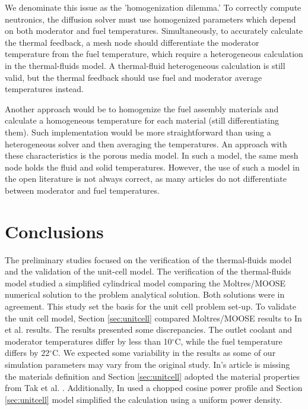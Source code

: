 We denominate this issue as the 'homogenization dilemma.'
To correctly compute neutronics, the diffusion solver must use homogenized parameters which depend on both moderator and fuel temperatures.
Simultaneously, to accurately calculate the thermal feedback, a mesh node should differentiate the moderator temperature from the fuel temperature, which require a heterogeneous calculation in the thermal-fluids model.
A thermal-fluid heterogeneous calculation is still valid, but the thermal feedback should use fuel and moderator average temperatures instead.

Another approach would be to homogenize the fuel assembly materials and calculate a homogeneous temperature for each material (still differentiating them).
Such implementation would be more straightforward than using a heterogeneous solver and then averaging the temperatures.
An approach with these characteristics is the porous media model.
In such a model, the same mesh node holds the fluid and solid temperatures.
However, the use of such a model in the open literature is not always correct, as many articles do not differentiate between moderator and fuel temperatures.

\section{Conclusions}

The preliminary studies focused on the verification of the thermal-fluids model and the validation of the unit-cell model.
The verification of the thermal-fluids model studied a simplified cylindrical model comparing the Moltres/MOOSE numerical solution to the problem analytical solution.
Both solutions were in agreement.
This study set the basis for the unit cell problem set-up.
To validate the unit cell model, Section \ref{sec:unitcell} compared Moltres/MOOSE results to In et al. \cite{in_three-dimensional_2006} results.
The results presented some discrepancies.
The outlet coolant and moderator temperatures differ by less than 10$^{\circ}$C, while the fuel temperature differs by 22$^{\circ}$C.
We expected some variability in the results as some of our simulation parameters may vary from the original study.
In's article is missing the materials definition and Section \ref{sec:unitcell} adopted the material properties from Tak et al. \cite{tak_numerical_2008}.
Additionally, In used a chopped cosine power profile and Section \ref{sec:unitcell} model simplified the calculation using a uniform power density.

